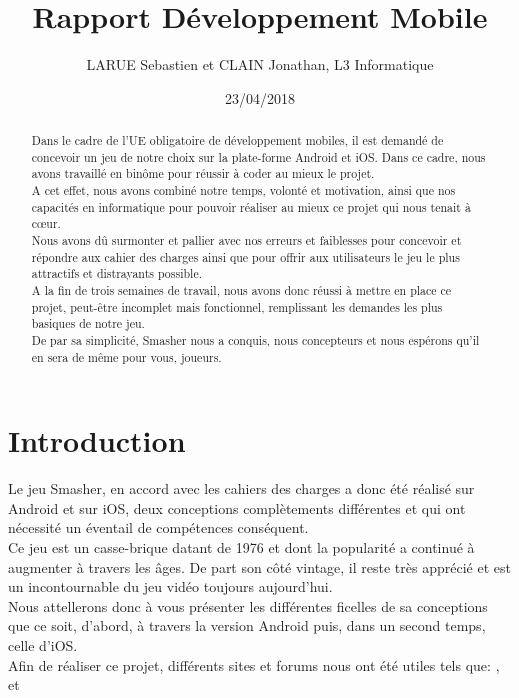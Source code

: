 \documentclass[a4paper]{article}
\title{Rapport Développement Mobile}
\author{LARUE Sebastien et CLAIN Jonathan, L3 Informatique}
\date{23/04/2018}
\begin{document}
\vspace{10mm}

\maketitle
\begin{abstract}
\Large
Dans le cadre de l'UE obligatoire de développement mobiles, il est demandé de concevoir un jeu de notre choix sur la plate-forme Android et iOS. Dans ce cadre, nous avons travaillé en binôme pour réussir à coder au mieux le projet.\\
A cet effet, nous avons combiné notre temps, volonté et motivation, ainsi que nos capacités en informatique pour pouvoir réaliser au mieux ce projet qui nous tenait à cœur.\\
Nous avons dû surmonter et pallier avec nos erreurs et faiblesses pour concevoir et répondre aux cahier des charges ainsi que pour offrir aux utilisateurs le jeu le plus attractifs et distrayants possible.\\
A la fin de trois semaines de travail, nous avons donc réussi à mettre en place ce projet, peut-être incomplet mais fonctionnel, remplissant les demandes les plus basiques de notre jeu.\\
De par sa simplicité, Smasher nous a conquis, nous concepteurs et nous espérons qu'il en sera de même pour vous, joueurs.\\
\end{abstract}

\newpage
\part*{Introduction}
\Large
Le jeu Smasher, en accord avec les cahiers des charges a donc été réalisé sur Android et sur iOS, deux conceptions complètements différentes et qui ont nécessité un éventail de compétences conséquent.\\
Ce jeu est un casse-brique datant de 1976 et dont la popularité a continué à augmenter à travers les âges. De part son côté vintage, il reste très apprécié et est un incontournable du jeu vidéo toujours aujourd'hui.\\
Nous attellerons donc à vous présenter les différentes ficelles de sa conceptions que ce soit, d'abord, à travers la version Android puis, dans un second temps, celle d'iOS.\\
Afin de réaliser ce projet, différents sites et forums nous ont été utiles tels que: \cite{AndroidStudio}, \cite{Apple} et \cite{OpenClassroom}
\end{document}

